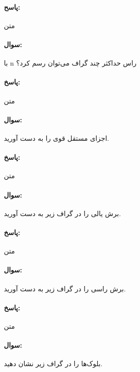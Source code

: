 \documentclass[a4paper,10pt]{article}
\begin{document}
    \paragraph{پاسح:} متن

    \noindent\hrulefill

    \paragraph{سوال:} با n راس حداکثر چند گراف می‌توان رسم کرد؟

    \paragraph{پاسخ:} متن

    \noindent\hrulefill

    \paragraph{سوال:} اجزای مستقل قوی را به دست آورید.

    \paragraph{پاسخ:} متن

    \noindent\hrulefill

    \paragraph{سوال:} برش یالی را در گراف زیر به دست آورید.

    \paragraph{پاسخ:} متن

    \noindent\hrulefill

    \paragraph{سوال:} برش راسی را در گراف زیر به دست آورید.

    \paragraph{پاسخ:} متن

    \noindent\hrulefill

    \paragraph{سوال:} بلوک‌ها را در گراف زیر نشان دهید.
\end{document}
